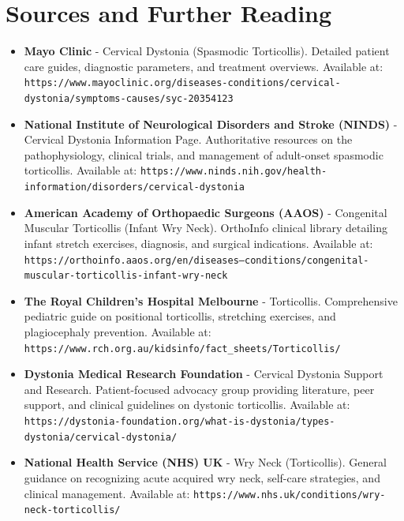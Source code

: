 \section*{Sources and Further Reading}
\begin{itemize}
    \item \textbf{Mayo Clinic} - Cervical Dystonia (Spasmodic Torticollis). Detailed patient care guides, diagnostic parameters, and treatment overviews. Available at: \texttt{https://www.mayoclinic.org/diseases-conditions/cervical-dystonia/symptoms-causes/syc-20354123}
    \item \textbf{National Institute of Neurological Disorders and Stroke (NINDS)} - Cervical Dystonia Information Page. Authoritative resources on the pathophysiology, clinical trials, and management of adult-onset spasmodic torticollis. Available at: \texttt{https://www.ninds.nih.gov/health-information/disorders/cervical-dystonia}
    \item \textbf{American Academy of Orthopaedic Surgeons (AAOS)} - Congenital Muscular Torticollis (Infant Wry Neck). OrthoInfo clinical library detailing infant stretch exercises, diagnosis, and surgical indications. Available at: \texttt{https://orthoinfo.aaos.org/en/diseases--conditions/congenital-muscular-torticollis-infant-wry-neck}
    \item \textbf{The Royal Children's Hospital Melbourne} - Torticollis. Comprehensive pediatric guide on positional torticollis, stretching exercises, and plagiocephaly prevention. Available at: \texttt{https://www.rch.org.au/kidsinfo/fact\_sheets/Torticollis/}
    \item \textbf{Dystonia Medical Research Foundation} - Cervical Dystonia Support and Research. Patient-focused advocacy group providing literature, peer support, and clinical guidelines on dystonic torticollis. Available at: \texttt{https://dystonia-foundation.org/what-is-dystonia/types-dystonia/cervical-dystonia/}
    \item \textbf{National Health Service (NHS) UK} - Wry Neck (Torticollis). General guidance on recognizing acute acquired wry neck, self-care strategies, and clinical management. Available at: \texttt{https://www.nhs.uk/conditions/wry-neck-torticollis/}
\end{itemize}